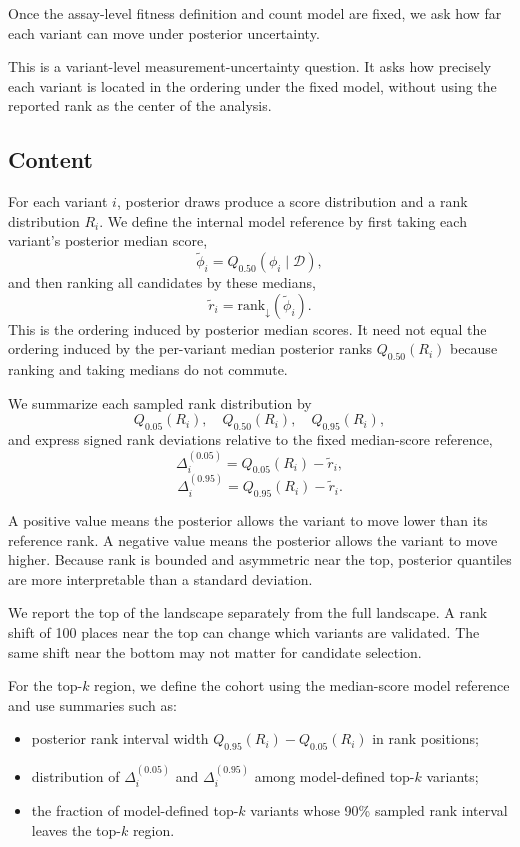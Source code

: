 \documentclass[11pt]{article}
\newcommand{\fit}{\phi}
\newcommand{\data}{\mathcal{D}}
\newcommand{\rank}{\mathrm{rank}}
\begin{document}
Once the assay-level fitness definition and count model are fixed, we ask how far each variant can move under posterior uncertainty.

This is a variant-level measurement-uncertainty question. It asks how precisely each variant is located in the ordering under the fixed model, without using the reported rank as the center of the analysis.

\subsection*{Content}

For each variant $i$, posterior draws produce a score distribution and a rank distribution $R_i$. We define the internal model reference by first taking each variant's posterior median score,
\[
\widetilde \fit_i = Q_{0.50}(\fit_i \mid \data),
\]
and then ranking all candidates by these medians,
\[
\widetilde r_i = \rank_{\downarrow}(\widetilde \fit_i).
\]
This is the ordering induced by posterior median scores. It need not equal the ordering induced by the per-variant median posterior ranks $Q_{0.50}(R_i)$ because ranking and taking medians do not commute.

We summarize each sampled rank distribution by
\[
Q_{0.05}(R_i), \quad Q_{0.50}(R_i), \quad Q_{0.95}(R_i),
\]
and express signed rank deviations relative to the fixed median-score reference,
\[
\Delta_i^{(0.05)} = Q_{0.05}(R_i) - \widetilde r_i,
\]
\[
\Delta_i^{(0.95)} = Q_{0.95}(R_i) - \widetilde r_i.
\]

A positive value means the posterior allows the variant to move lower than its reference rank. A negative value means the posterior allows the variant to move higher. Because rank is bounded and asymmetric near the top, posterior quantiles are more interpretable than a standard deviation.

We report the top of the landscape separately from the full landscape. A rank shift of 100 places near the top can change which variants are validated. The same shift near the bottom may not matter for candidate selection.

For the top-$k$ region, we define the cohort using the median-score model reference and use summaries such as:
\begin{itemize}
  \item posterior rank interval width $Q_{0.95}(R_i)-Q_{0.05}(R_i)$ in rank positions;
  \item distribution of $\Delta_i^{(0.05)}$ and $\Delta_i^{(0.95)}$ among model-defined top-$k$ variants;
  \item the fraction of model-defined top-$k$ variants whose 90\% sampled rank interval leaves the top-$k$ region.
\end{itemize}
\end{document}
